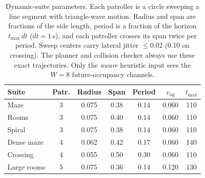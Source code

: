 \documentclass[letterpaper]{article} %
\begin{document}
\begin{table}[t]
\centering
\small
\setlength{\tabcolsep}{2.5pt}
\begin{tabular}{@{}lcccccc@{}}
\toprule
Suite & Patr. & Radius & Span & Period & $v_{\mathrm{ag}}$ & $t_{\max}$ \\
\midrule
Maze & 3 & 0.075 & 0.38 & 0.14 & 0.060 & 110 \\
Rooms & 3 & 0.075 & 0.40 & 0.14 & 0.060 & 110 \\
Spiral & 3 & 0.075 & 0.38 & 0.14 & 0.060 & 110 \\
Dense maze & 4 & 0.062 & 0.42 & 0.17 & 0.060 & 140 \\
Crossing & 4 & 0.055 & 0.50 & 0.30 & 0.060 & 110 \\
Large rooms & 5 & 0.075 & 0.36 & 0.14 & 0.120 & 130 \\
\bottomrule
\end{tabular}
\caption{Dynamic-suite parameters. Each patroller is a circle sweeping a line segment with triangle-wave motion. Radius and span are fractions of the side length, period is a fraction of the horizon $t_{\max}\,dt$ ($dt{=}1$\,s), and each patroller crosses its span twice per period. Sweep centers carry lateral jitter $\leq 0.02$ (0.10 on crossing). The planner and collision checker always use these exact trajectories. Only the \emph{aware} heuristic input sees the $W{=}8$ future-occupancy channels.}
\label{tab:dynspec}
\end{table}
\end{document}
